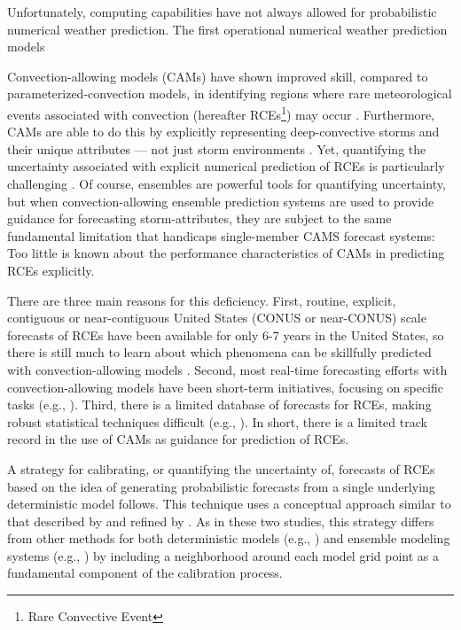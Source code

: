 Unfortunately, computing capabilities have not always allowed for probabilistic numerical weather prediction.
The first operational numerical weather prediction models





Convection-allowing models (CAMs) have shown improved skill, compared to parameterized-convection models, in identifying regions where rare meteorological events associated with convection (hereafter RCEs\footnote{Rare Convective Event}) may occur \citep{Clark2010a}.
Furthermore, CAMs are able to do this by explicitly representing deep-convective storms and their unique attributes --- not just storm environments \citep{Kain2010}.
Yet, quantifying the uncertainty associated with explicit numerical prediction of RCEs is particularly challenging \citep{Sobash2011}.
Of course, ensembles are powerful tools for quantifying uncertainty, but when convection-allowing ensemble prediction systems are used to provide guidance for forecasting storm-attributes, they are subject to the same fundamental limitation that handicaps single-member CAMS forecast systems: Too little is known about the performance characteristics of CAMs in predicting RCEs explicitly.


There are three main reasons for this deficiency.
First, routine, explicit, contiguous  or near-contiguous United States (CONUS or near-CONUS) scale forecasts of RCEs have been available for only 6-7 years in the United States, so there is still much to learn about which phenomena can be skillfully predicted with convection-allowing models \citep{Kain2008, Kain2010}.
Second, most real-time forecasting efforts with convection-allowing models have been short-term initiatives, focusing on specific tasks (e.g., \citealp{Done2004, Weisman2008}).
Third, there is a limited database of forecasts for RCEs, making robust statistical techniques difficult (e.g., \citealp{Hamill2006}).
In short, there is a limited track record in the use of CAMs as guidance for prediction of RCEs.


A strategy for calibrating, or quantifying the uncertainty of, forecasts of RCEs based on the idea of generating probabilistic forecasts from a single underlying deterministic model follows.
This technique uses a conceptual approach similar to that described by \cite{Theis2005} and refined by \cite{Sobash2011}.
As in these two studies, this strategy differs from other methods for both deterministic models (e.g., \citealp{Glahn1972}) and ensemble modeling systems (e.g., \citealp{Hamill1998, Raftery2005, Clark2009, Glahn2009}) by including a neighborhood around each model grid point as a fundamental component of the calibration process.


